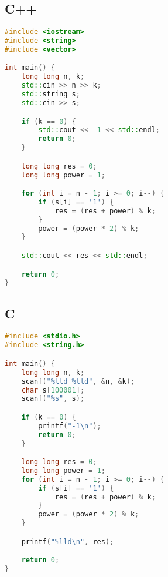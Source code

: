 \documentclass{article}
\begin{document}
\subsection*{C++}
\begin{lstlisting}[language=C++]
#include <iostream>
#include <string>
#include <vector>

int main() {
    long long n, k;
    std::cin >> n >> k;
    std::string s;
    std::cin >> s;

    if (k == 0) {
        std::cout << -1 << std::endl;
        return 0;
    }

    long long res = 0;
    long long power = 1;

    for (int i = n - 1; i >= 0; i--) {
        if (s[i] == '1') {
            res = (res + power) % k;
        }
        power = (power * 2) % k;
    }

    std::cout << res << std::endl;

    return 0;
}
\end{lstlisting}

\subsection*{C}
\begin{lstlisting}[language=C]
#include <stdio.h>
#include <string.h>

int main() {
    long long n, k;
    scanf("%lld %lld", &n, &k);
    char s[100001];
    scanf("%s", s);

    if (k == 0) {
        printf("-1\n");
        return 0;
    }

    long long res = 0;
    long long power = 1;
    for (int i = n - 1; i >= 0; i--) {
        if (s[i] == '1') {
            res = (res + power) % k;
        }
        power = (power * 2) % k;
    }

    printf("%lld\n", res);

    return 0;
}
\end{lstlisting}
\end{document}
